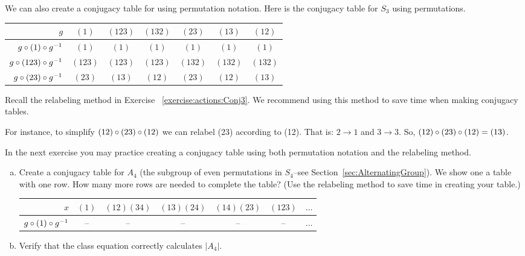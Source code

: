 \begin{example}\label{example:actions:Conj 18}
We can also create a conjugacy table for using permutation notation. Here is the conjugacy table for $S_3$ using permutations.
  
\begin{center}
\begin{tabular}{|r | c | c |c | c | c |c |}\hline
$g$ &$(1)$ & $(123)$ &$(132)$ & $(23)$ & $(13)$ & $(12)$\\ \hline
$g\circ (1)\circ g^{-1}$ &$(1)$ & $(1)$ & $(1)$ &$(1)$ &$(1)$ & $(1)$ \\ \hline
$ g\circ (123)\circ g^{-1}$& $(123)$&$(123)$& $(123)$&$(132)$ &$(132)$ & $(132)$\\ \hline
$g\circ(23)\circ g^{-1}$ & $(23)$ &$(13)$ & $(12)$ & $(23)$ & $(12)$ & $(13)$\\ \hline 
\end{tabular}
\end{center}

Recall the relabeling method in Exercise  ~\ref{exercise:actions:Conj3}.  We recommend using this method to save time when making conjugacy tables.  

For instance, to simplify $(12)\circ (23)\circ (12)$ we can relabel (23) according to (12).  That is: $2\rightarrow 1$ and $3\rightarrow 3$.  So,  $(12)\circ (23)\circ (12)=(13)$.
\end{example}

In the next exercise you may practice creating a conjugacy table using both permutation notation and the relabeling method.

\begin{exercise}\label{exercise:actions:Conj 19}
\begin{enumerate}[(a)]
\item Create a conjugacy table for $A_4$ (the subgroup of even permutations in $S_4$--see Section~\ref{sec:AlternatingGroup}). We show one a table with one row.  How many more rows are needed to complete the  table? (Use the relabeling method to save time in creating your table.)

\begin{center}
\begin{tabular}
{|r |c| c| c| c| c|c}\hline
 $x$& $(1)$& $(12)(34)$&$(13)(24)$&$(14)(23)$&$(123)$&$\ldots$\\ \hline
$g \circ(1)\circ g^{-1}$ & -- & --& --&--&--& $\ldots$ \\ 
\end{tabular}
\end{center}

\item Verify that the class equation correctly calculates $|A_4|$.
\end{enumerate}
\end{exercise}


